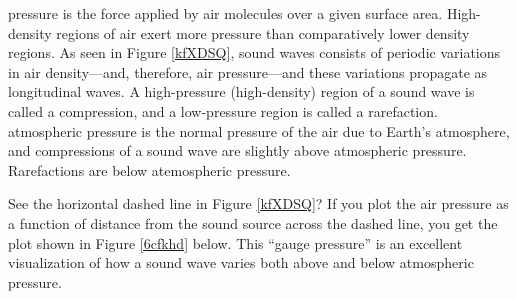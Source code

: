 \documentclass{article}
\numberwithin{equation}{section}
\numberwithin{figure}{section}
\begin{document}
\begin{center}
    \captionsetup{type=figure,margin=1in,font=scriptsize}
\end{center}


\Gls{pressure} is the force applied by air molecules over a given surface area. High-density regions of air exert more pressure than comparatively lower density regions. As seen in Figure \ref{kfXDSQ}, sound waves consists of periodic variations in air density---and, therefore, air pressure---and these variations propagate as longitudinal waves. A high-pressure (high-density) region of a sound wave is called a \gls{compression}, and a low-pressure region is called a \gls{rarefaction}. \Gls{atmospheric pressure} is the normal pressure of the air due to Earth's atmosphere, and compressions of a sound wave are slightly above atmospheric pressure. Rarefactions are below atemospheric pressure. 

\vspace{1em}

See the horizontal dashed line in Figure \ref{kfXDSQ}? If you plot the air pressure as a function of distance from the sound source across the dashed line, you get the plot shown in Figure \ref{6cfkhd} below. This ``gauge pressure'' is an excellent visualization of how a sound wave varies both above and below atmospheric pressure.
\vspace{1em}
\end{document}
